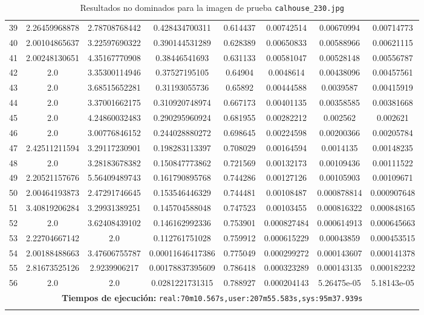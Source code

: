 \begin{longtable}{|c|c|c|c|c|c|c|c|}
39 & 2.26459968878 & 2.78708768442 & 0.428434700311 & 0.614437 & 0.00742514 & 0.00670994 & 0.00714773 \\
40 & 2.00104865637 & 3.22597690322 & 0.390144531289 & 0.628389 & 0.00650833 & 0.00588966 & 0.00621115 \\
41 & 2.00248130651 & 4.35167770908 & 0.38446541693 & 0.631133 & 0.00581047 & 0.00528148 & 0.00556787 \\
42 & 2.0 & 3.35300114946 & 0.37527195105 & 0.64904 & 0.0048614 & 0.00438096 & 0.00457561 \\
43 & 2.0 & 3.68515652281 & 0.31193055736 & 0.65892 & 0.00444588 & 0.0039587 & 0.00415919 \\
44 & 2.0 & 3.37001662175 & 0.310920748974 & 0.667173 & 0.00401135 & 0.00358585 & 0.00381668 \\
45 & 2.0 & 4.24860032483 & 0.290295960924 & 0.681955 & 0.00282212 & 0.002562 & 0.002621 \\
46 & 2.0 & 3.00776846152 & 0.244028880272 & 0.698645 & 0.00224598 & 0.00200366 & 0.00205784 \\
47 & 2.42511211594 & 3.29117230901 & 0.198283113397 & 0.708029 & 0.00164594 & 0.0014135 & 0.00148235 \\
48 & 2.0 & 3.28183678382 & 0.150847773862 & 0.721569 & 0.00132173 & 0.00109436 & 0.00111522 \\
49 & 2.20521157676 & 5.56409489743 & 0.161790895768 & 0.744286 & 0.00127126 & 0.00105903 & 0.00109671 \\
50 & 2.00464193873 & 2.47291746645 & 0.153546446329 & 0.744481 & 0.00108487 & 0.000878814 & 0.000907648 \\
51 & 3.40819206284 & 3.29931389251 & 0.145704588048 & 0.747523 & 0.00103455 & 0.000816322 & 0.000848165 \\
52 & 2.0 & 3.62408439102 & 0.146162992336 & 0.753901 & 0.000827484 & 0.000614913 & 0.000645663 \\
53 & 2.22704667142 & 2.0 & 0.112761751028 & 0.759912 & 0.000615229 & 0.00043859 & 0.000453515 \\
54 & 2.00188488663 & 3.47606755787 & 0.00011646417386 & 0.775049 & 0.000299272 & 0.000143607 & 0.000141378 \\
55 & 2.81673525126 & 2.9239906217 & 0.00178837395609 & 0.786418 & 0.000323289 & 0.000143135 & 0.000182232 \\
56 & 2.0 & 2.0 & 0.0281221731315 & 0.788927 & 0.000204143 & 5.26475e-05 & 5.18143e-05 \\
 \hline
\multicolumn{8}{|c|}{\textbf{Tiempos de ejecución:} \texttt{real:70m10.567s,user:207m55.583s,sys:95m37.939s}}\\  \hline
\caption{Resultados no dominados para la imagen de prueba \texttt{calhouse\_230.jpg}}
\label{tab:calhouse_230}
\end{longtable}
\normalsize

